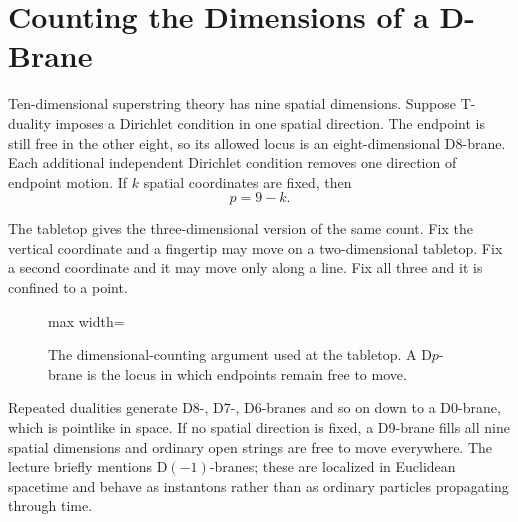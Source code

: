 \section{Counting the Dimensions of a D-Brane}

Ten-dimensional superstring theory has nine spatial dimensions.  Suppose
T-duality imposes a Dirichlet condition in one spatial direction.  The
endpoint is still free in the other eight, so its allowed locus is an
eight-dimensional D8-brane.  Each additional independent Dirichlet
condition removes one direction of endpoint motion.  If \(k\) spatial
coordinates are fixed, then
\begin{equation}
  p=9-k.
  \label{eq:l10-dp-counting}
\end{equation}

The tabletop gives the three-dimensional version of the same count.  Fix
the vertical coordinate and a fingertip may move on a two-dimensional
tabletop.  Fix a second coordinate and it may move only along a line.  Fix
all three and it is confined to a point.

\begin{figure}[H]
  \centering
  \begin{adjustbox}{max width=\linewidth}
  \end{adjustbox}
  \caption{The dimensional-counting argument used at the tabletop.  A
  D\(p\)-brane is the locus in which endpoints remain free to move.}
  \label{fig:l10-dp-counting-redraw}
\end{figure}

Repeated dualities generate D8-, D7-, D6-branes and so on down to a D0-brane,
which is pointlike in space.  If no spatial direction is fixed, a D9-brane
fills all nine spatial dimensions and ordinary open strings are free to move
everywhere.  The lecture briefly mentions D\((-1)\)-branes; these are
localized in Euclidean spacetime and behave as instantons rather than as
ordinary particles propagating through time.

